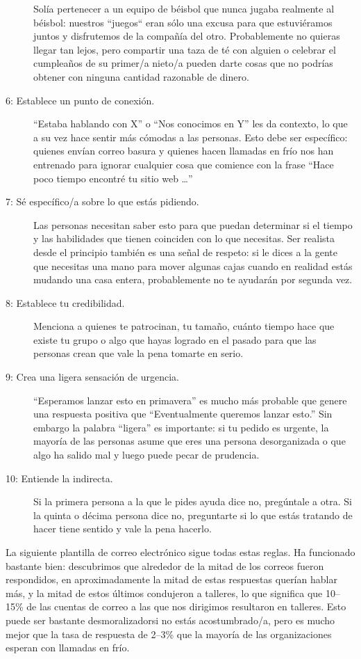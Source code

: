 \begin{description}
Solía pertenecer a un equipo de béisbol que nunca jugaba realmente al béisbol:
nuestros ``juegos`` eran sólo una excusa para que estuviéramos juntos y disfrutemos de la compañía del otro.
Probablemente no quieras llegar tan lejos,
pero compartir una taza de té con alguien o celebrar el cumpleaños de su primer/a nieto/a
pueden darte cosas que no podrías obtener con ninguna cantidad razonable de dinero.
\item[6: Establece un punto de conexión.]
``Estaba hablando con X'' o ``Nos conocimos en Y'' les da contexto,
lo que a su vez hace sentir más cómodas a las personas.
Esto debe ser específico:
quienes envían correo basura y quienes hacen llamadas en frío
nos han entrenado para ignorar cualquier cosa que comience con la frase
``Hace poco tiempo encontré tu sitio web {\ldots}''

\item[7: Sé específico/a sobre lo que estás pidiendo.]

Las personas necesitan saber esto
para que puedan determinar si el tiempo y las habilidades que tienen
coinciden con lo que necesitas.
Ser realista desde el principio también es una señal de respeto:
 si le dices a la gente que necesitas una mano para  mover algunas cajas cuando en realidad estás mudando una casa entera,
 probablemente no te ayudarán por segunda vez.

\item[8: Establece tu credibilidad.]
Menciona a quienes te patrocinan,
tu tamaño,
cuánto tiempo hace que existe tu grupo o algo que hayas logrado en el pasado
para que las personas crean que vale la pena tomarte en serio.

\item[9: Crea una ligera sensación de urgencia.]
``Esperamos lanzar esto en primavera'' es mucho más probable que genere una respuesta positiva que ``Eventualmente queremos lanzar esto.''
Sin embargo la palabra ``ligera'' es importante:
si tu pedido es urgente, 
la mayoría de las personas asume que eres una persona desorganizada o que algo ha salido mal
y luego puede pecar de prudencia.

\item[10: Entiende la indirecta.]
Si la primera persona a la que le pides ayuda dice no,
pregúntale a otra.
Si la quinta o décima persona dice no,
preguntarte si lo que estás tratando de hacer tiene sentido y vale la pena hacerlo.
\end{description}

La siguiente plantilla de correo electrónico sigue todas estas reglas.
Ha funcionado bastante bien:
descubrimos que alrededor de la mitad de los correos fueron respondidos, en
aproximadamente  la mitad de estas respuestas querían hablar más,
y la mitad de estos últimos condujeron a talleres,
lo que significa que 10--15\% de las cuentas de correo a las que nos dirigimos resultaron en talleres.
Esto puede ser bastante desmoralizadorsi no estás acostumbrado/a, 
pero es mucho mejor que la tasa de respuesta de 2--3\% que la mayoría de las organizaciones esperan con llamadas en frío.

